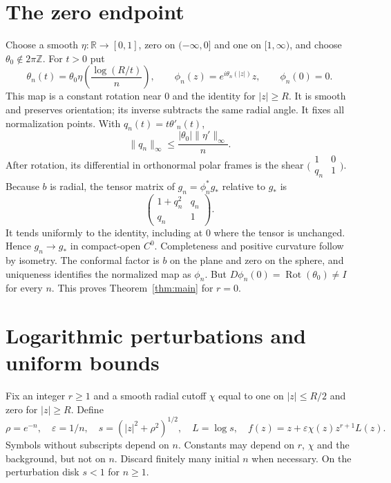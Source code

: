 \documentclass[11pt]{article}
\newcommand{\R}{\mathbb R}
\begin{document}
\section{The zero endpoint}
Choose a smooth $\eta:\R\to[0,1]$, zero on $(-\infty,0]$ and one on $[1,\infty)$, and choose $\theta_0\notin2\pi\mathbb Z$. For $t>0$ put
\[
 \theta_n(t)=\theta_0\eta\left(\frac{\log(R/t)}n\right),\qquad
 \phi_n(z)=e^{i\theta_n(|z|)}z,\qquad \phi_n(0)=0.
\]
This map is a constant rotation near $0$ and the identity for $|z|\geq R$. It is smooth and preserves orientation; its inverse subtracts the same radial angle. It fixes all normalization points. With $q_n(t)=t\theta'_n(t)$,
\[
 \|q_n\|_\infty\leq\frac{|\theta_0|\|\eta'\|_\infty}{n}.
\]
After rotation, its differential in orthonormal polar frames is the shear $\bigl(\begin{smallmatrix}1&0\\q_n&1\end{smallmatrix}\bigr)$. Because $b$ is radial, the tensor matrix of $g_n=\phi_n^*g_*$ relative to $g_*$ is
\[
 \begin{pmatrix}1+q_n^2&q_n\\q_n&1\end{pmatrix}.
\]
It tends uniformly to the identity, including at $0$ where the tensor is unchanged. Hence $g_n\to g_*$ in compact-open $C^0$. Completeness and positive curvature follow by isometry. The conformal factor is $b$ on the plane and zero on the sphere, and uniqueness identifies the normalized map as $\phi_n$. But $D\phi_n(0)=\operatorname{Rot}(\theta_0)\ne I$ for every $n$. This proves Theorem~\ref{thm:main} for $r=0$.

\section{Logarithmic perturbations and uniform bounds}
Fix an integer $r\geq1$ and a smooth radial cutoff $\chi$ equal to one on $|z|\leq R/2$ and zero for $|z|\geq R$. Define
\begin{equation}\label{eq:fn}
 \rho=e^{-n},\quad \varepsilon=1/n,\quad s=(|z|^2+\rho^2)^{1/2},
 \quad L=\log s,\quad f(z)=z+\varepsilon\chi(z)z^{r+1}L(z).
\end{equation}
Symbols without subscripts depend on $n$. Constants may depend on $r$, $\chi$ and the background, but not on $n$. Discard finitely many initial $n$ when necessary. On the perturbation disk $s<1$ for $n\geq1$.
\end{document}
